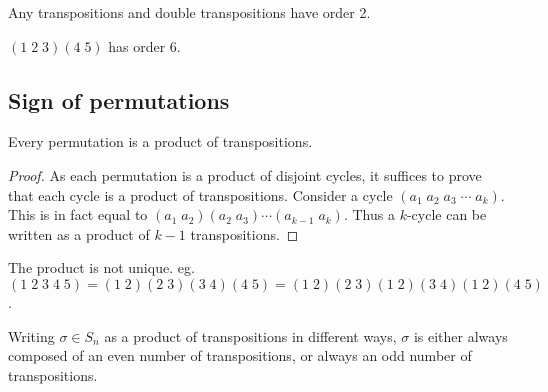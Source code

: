 \documentclass[a4paper]{article}
\begin{document}
  \begin{eg}
    Any transpositions and double transpositions have order 2.

    $(1\; 2\; 3)(4\; 5)$ has order 6.
  \end{eg}

  \subsection{Sign of permutations}
  \begin{prop}
    Every permutation is a product of transpositions.
  \end{prop}

  \begin{proof}
    As each permutation is a product of disjoint cycles, it suffices to prove that each cycle is a product of transpositions. Consider a cycle $(a_1\; a_2\; a_3\; \cdots\; a_k)$. This is in fact equal to $(a_1\; a_2)(a_2\; a_3)\cdots (a_{k-1}\; a_k)$. Thus a $k$-cycle can be written as a product of $k - 1$ transpositions.
  \end{proof}

  \note The product is not unique. eg. $(1\; 2\; 3\; 4\; 5) =(1\; 2)(2\; 3)(3\; 4)(4\; 5) = (1\; 2)(2\; 3)(1\; 2)(3\; 4)(1\; 2)(4\; 5)$.

  \begin{thm}
    Writing $\sigma\in S_n$ as a product of transpositions in different ways, $\sigma$ is either always composed of an even number of transpositions, or always an odd number of transpositions.
  \end{thm}
\end{document}
